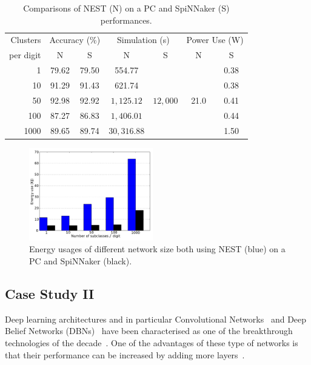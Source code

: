 \begin{table}[h]
\caption{Comparisons of NEST (N) on a PC and SpiNNaker (S) performances.}
\begin{center}
\begin{tabular} {r|c|c|c|c|c|c}
	 Clusters
	 &\multicolumn{2}{c|}{Accuracy (\%)}  &\multicolumn{2}{c|}{Simulation (s)}
	 &\multicolumn{2}{c}{Power Use (W)}   \\
	 \cline{2-7}
	 per digit
	& N & S & N & S & N & S\\
    \hline
    1 & 79.62 & 79.50 & 554.77 & \multirow{5}{*}{$12,000$} & \multirow{5}{*}{ 21.0 } & 0.38 \\
    10 & 91.29 & 91.43 & 621.74 &   &   & 0.38 \\
    50 & 92.98 & 92.92 & $1,125.12$ &   &   & 0.41 \\
    100 & 87.27 & 86.83 & $1,406.01$ &   &   & 0.44 \\
    1000 & 89.65 & 89.74 & $30,316.88$ &   &   & 1.50 \\

\end{tabular}
\label{tbl:compare}
\end{center}
\end{table}

\begin{figure}[hbt!]
	\centering
	\includegraphics[width=0.48\textwidth]{images/energy.pdf}
	\caption{Energy usages of different network size both using NEST (blue) on a PC and SpiNNaker (black).}
	\label{fig:energy}
\end{figure}
\subsection{Case Study II}
Deep learning architectures and in particular Convolutional Networks~\citep{lecun1998gradient} and Deep Belief Networks (DBNs)~\citep{hinton2006fast} have been characterised as one of the breakthrough technologies of the decade~\citep{MIT_TechReview}. One of the advantages of these type of networks is that their performance can be increased by adding more layers~\citep{hinton2006fast}.

